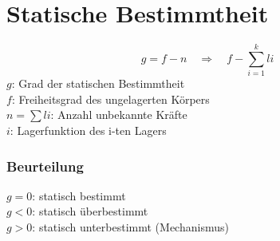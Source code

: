 



\section{Statische Bestimmtheit}
\[ g = f - n \quad \Rightarrow \quad f - \sum_{i=1}^k li \]
$g$: Grad der statischen Bestimmtheit\\
$f$: Freiheitsgrad des ungelagerten Körpers\\
$n = \sum li$: Anzahl unbekannte Kräfte\\
$i$: Lagerfunktion des i-ten Lagers
\subsubsection{Beurteilung}
$g = 0$: statisch bestimmt\\
$g < 0$: statisch überbestimmt\\
$g > 0$: statisch unterbestimmt (Mechanismus)
